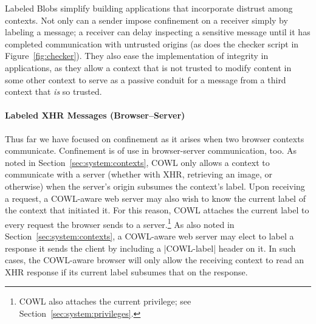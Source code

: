 Labeled Blobs simplify building applications that incorporate distrust
among contexts. Not only can a sender impose confinement on a receiver
simply by labeling a message; a receiver can delay inspecting a
sensitive message until it has completed communication with untrusted
origins (as does the checker script in Figure~\ref{fig:checker}). They
also ease the implementation of integrity in applications, as they
allow a context that is not trusted to modify content in some other
context to serve as a passive conduit for a message from a third
context that {\em is} so trusted.
%
%
%
%
%
%

\paragraph{Labeled XHR Messages (Browser--Server)}
\label{sec:system:labeled-xhr}
Thus far we have focused on confinement as it arises when two browser
contexts communicate. Confinement is of use in browser-server
communication, too. As noted in Section~\ref{sec:system:contexts},
COWL only allows a context to communicate with a server (whether with
XHR, retrieving an image, or otherwise) when the server's origin
subsumes the context's label. Upon receiving a request, a COWL-aware
web server may also wish to know the current label of the context that
initiated it. For this reason, COWL attaches the current label to
every request the browser sends to a server.\footnote{COWL also
  attaches the current privilege; see Section~\ref{sec:system:privileges}.}
  As also noted in
Section~\ref{sec:system:contexts}, a COWL-aware web server may elect
to label a response it sends the client by including a \js|COWL-label|
header on it. In such cases, the COWL-aware browser will only allow
the receiving context to read an XHR response if its current label
subsumes that on the response.

